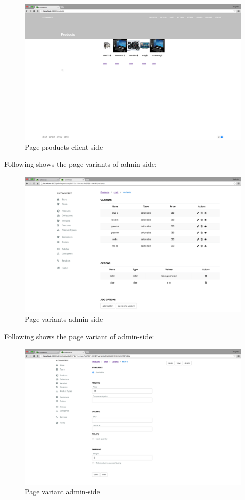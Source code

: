 \begin{figure}[htb]
\centering
\includegraphics[width=1.0\linewidth]{images/chapter4/page-products-all-cli.png}\hfill
\caption[page products client-side]{Page products client-side}
\label{fig:page_products_client_side}
\end{figure}
Following shows the page variants of admin-side:
\begin{figure}[htb]
\centering
\includegraphics[width=1.0\linewidth]{images/chapter4/page-variants.png}\hfill
\caption[page variants admin-side]{Page variants admin-side}
\label{fig:page_variants_admin_side}
\end{figure}
Following shows the page variant of admin-side:
\begin{figure}[htb]
\centering
\includegraphics[width=1.0\linewidth]{images/chapter4/page-variant.png}\hfill
\caption[page variant admin-side]{Page variant admin-side}
\label{fig:page_variants_admin_side}
\end{figure}


